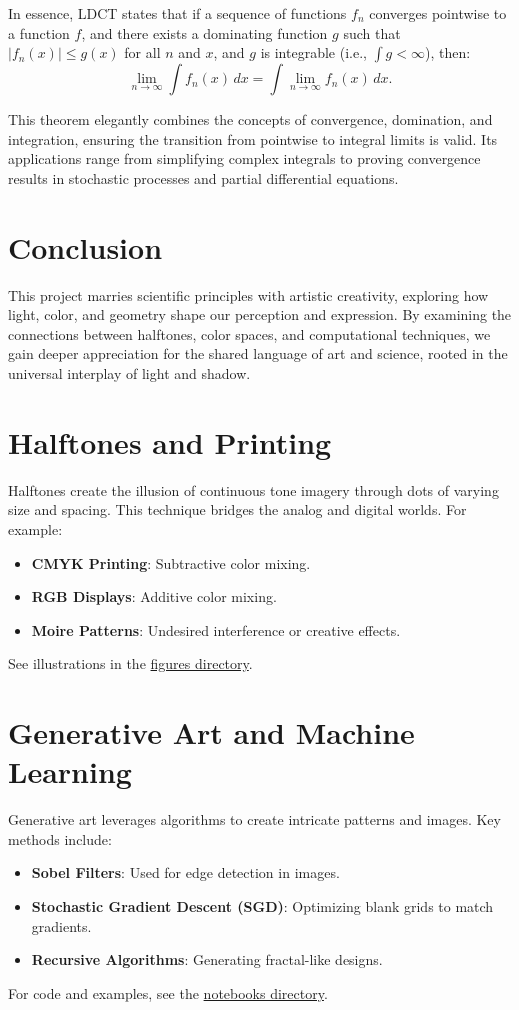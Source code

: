 In essence, LDCT states that if a sequence of functions \(f_n\) converges pointwise to a function \(f\), and there exists a dominating function \(g\) such that \(|f_n(x)| \leq g(x)\) for all \(n\) and \(x\), and \(g\) is integrable (i.e., \(\int g < \infty\)), then:
\[
\lim_{n \to \infty} \int f_n(x) \, dx = \int \lim_{n \to \infty} f_n(x) \, dx.
\]

This theorem elegantly combines the concepts of convergence, domination, and integration, ensuring the transition from pointwise to integral limits is valid. Its applications range from simplifying complex integrals to proving convergence results in stochastic processes and partial differential equations.



\section*{Conclusion}
This project marries scientific principles with artistic creativity, exploring how light, color, and geometry shape our perception and expression. By examining the connections between halftones, color spaces, and computational techniques, we gain deeper appreciation for the shared language of art and science, rooted in the universal interplay of light and shadow.


\section{Halftones and Printing}
Halftones create the illusion of continuous tone imagery through dots of varying size and spacing. This technique bridges the analog and digital worlds. For example:
\begin{itemize}
    \item \textbf{CMYK Printing}: Subtractive color mixing.
    \item \textbf{RGB Displays}: Additive color mixing.
    \item \textbf{Moire Patterns}: Undesired interference or creative effects.
\end{itemize}
See illustrations in the \href{./figures}{figures directory}.

\section{Generative Art and Machine Learning}
Generative art leverages algorithms to create intricate patterns and images. Key methods include:
\begin{itemize}
    \item \textbf{Sobel Filters}: Used for edge detection in images.
    \item \textbf{Stochastic Gradient Descent (SGD)}: Optimizing blank grids to match gradients.
    \item \textbf{Recursive Algorithms}: Generating fractal-like designs.
\end{itemize}
For code and examples, see the \href{./notebooks}{notebooks directory}.

